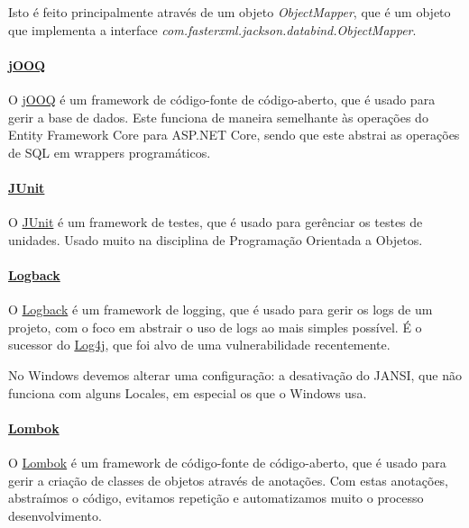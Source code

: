 Isto é feito principalmente através de um objeto \textit{ObjectMapper}, que é um objeto que implementa a interface \textit{com.fasterxml.jackson.databind.ObjectMapper}.

\paragraph{\href{https://jooq.org/}{jOOQ}\\}

O \href{https://jooq.org/}{jOOQ} é um framework de código-fonte de código-aberto, que é usado para gerir a base de dados. Este funciona de maneira semelhante às operações do Entity Framework Core para ASP.NET Core, sendo que este abstrai as operações de SQL em wrappers programáticos.\cite{jooq}

\paragraph{\href{https://junit.org/junit5/}{JUnit}\\}

O \href{https://junit.org/junit5/}{JUnit} é um framework de testes, que é usado para gerênciar os testes de unidades. Usado muito na disciplina de Programação Orientada a Objetos.\cite{junit}

\paragraph{\href{https://logback.qos.ch/}{Logback}\\}

O \href{https://logback.qos.ch/}{Logback} é um framework de logging, que é usado para gerir os logs de um projeto, com o foco em abstrair o uso de logs ao mais simples possível. É o sucessor do \href{https://log4j.org/}{Log4j}, que foi alvo de uma vulnerabilidade recentemente.\cite{logback}

No Windows devemos alterar uma configuração: a desativação do JANSI, que não funciona com alguns Locales, em especial os que o Windows usa.

\paragraph{\href{https://projectlombok.org/}{Lombok}\\}

O \href{https://projectlombok.org/}{Lombok} é um framework de código-fonte de código-aberto, que é usado para gerir a criação de classes de objetos através de anotações. Com estas anotações, abstraímos o código, evitamos repetição e automatizamos muito o processo desenvolvimento.\cite{lombok}

